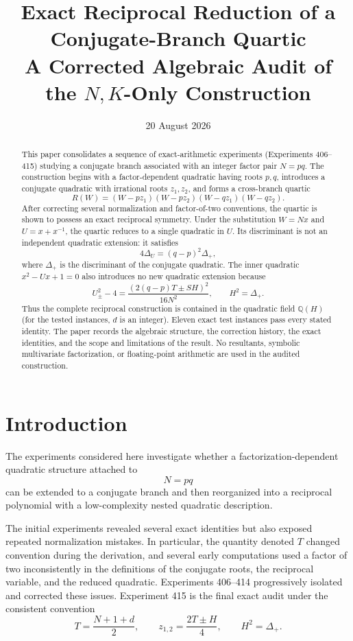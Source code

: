 \documentclass[11pt,a4paper]{article}
\title{\textbf{Exact Reciprocal Reduction of a Conjugate-Branch Quartic}\\
\large A Corrected Algebraic Audit of the \texorpdfstring{$N,K$}{N,K}-Only Construction}
\author{}
\date{20 August 2026}
\theoremstyle{definition}
\theoremstyle{remark}
\newcommand{\Q}{\mathbb{Q}}
\begin{document}
\maketitle

\begin{abstract}
This paper consolidates a sequence of exact-arithmetic experiments (Experiments 406--415) studying a conjugate branch associated with an integer factor pair $N=pq$. The construction begins with a factor-dependent quadratic having roots $p,q$, introduces a conjugate quadratic with irrational roots $z_1,z_2$, and forms a cross-branch quartic
\[
R(W)=(W-pz_1)(W-pz_2)(W-qz_1)(W-qz_2).
\]
After correcting several normalization and factor-of-two conventions, the quartic is shown to possess an exact reciprocal symmetry. Under the substitution $W=Nx$ and $U=x+x^{-1}$, the quartic reduces to a single quadratic in $U$. Its discriminant is not an independent quadratic extension: it satisfies
\[
4\Delta_U=(q-p)^2\Delta_+,
\]
where $\Delta_+$ is the discriminant of the conjugate quadratic. The inner quadratic $x^2-Ux+1=0$ also introduces no new quadratic extension because
\[
U_\pm^2-4
=\frac{\left(2(q-p)T\pm S H\right)^2}{16N^2},
\qquad H^2=\Delta_+.
\]
Thus the complete reciprocal construction is contained in the quadratic field $\Q(H)$ (for the tested instances, $d$ is an integer). Eleven exact test instances pass every stated identity. The paper records the algebraic structure, the correction history, the exact identities, and the scope and limitations of the result. No resultants, symbolic multivariate factorization, or floating-point arithmetic are used in the audited construction.
\end{abstract}

\tableofcontents
\newpage

\section{Introduction}

The experiments considered here investigate whether a factorization-dependent quadratic structure attached to
\[
N=pq
\]
can be extended to a conjugate branch and then reorganized into a reciprocal polynomial with a low-complexity nested quadratic description.

The initial experiments revealed several exact identities but also exposed repeated normalization mistakes. In particular, the quantity denoted $T$ changed convention during the derivation, and several early computations used a factor of two inconsistently in the definitions of the conjugate roots, the reciprocal variable, and the reduced quadratic. Experiments 406--414 progressively isolated and corrected these issues. Experiment 415 is the final exact audit under the consistent convention
\[
T=\frac{N+1+d}{2},
\qquad
z_{1,2}=\frac{2T\pm H}{4},
\qquad H^2=\Delta_+.
\]
\end{document}
